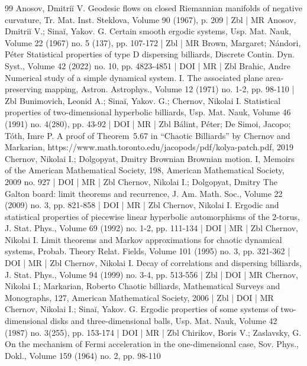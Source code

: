 \documentclass[10pt]{amsart}
\theoremstyle{definition}\newtheorem{defi}[theo]{Definition}\newtheorem{rema}[theo]{Remark}\newtheorem{exam}[theo]{Example}\newtheorem{exem}[theo]{Example}\newtheorem{nota}[theo]{Notation}
\begin{document}
\begin{thebibliography}{99}
Anosov, Dmitriĭ V. Geodesic flows on closed Riemannian manifolds of negative curvature, Tr. Mat. Inst. Steklova, Volume 90 (1967), p. 209 | Zbl | MR
Anosov, Dmitriĭ V.; Sinaĭ, Yakov. G. Certain smooth ergodic systems, Usp. Mat. Nauk, Volume 22 (1967) no. 5 (137), pp. 107-172 | Zbl | MR
Brown, Margaret; Nándori, Péter Statistical properties of type D dispersing billiards, Discrete Contin. Dyn. Syst., Volume 42 (2022) no. 10, pp. 4823-4851 | DOI | MR | Zbl
Brahic, Andre Numerical study of a simple dynamical system. I. The associated plane area-preserving mapping, Astron. Astrophys., Volume 12 (1971) no. 1-2, pp. 98-110 | Zbl
Bunimovich, Leonid A.; Sinaĭ, Yakov. G.; Chernov, Nikolai I. Statistical properties of two-dimensional hyperbolic billiards, Usp. Mat. Nauk, Volume 46 (1991) no. 4(280), pp. 43-92 | DOI | MR | Zbl
Bálint, Péter; De Simoi, Jacopo; Tóth, Imre P. A proof of Theorem 5.67 in “Chaotic Billiards” by Chernov and Markarian, https://www.math.toronto.edu/jacopods/pdf/kolya-patch.pdf, 2019
Chernov, Nikolai I.; Dolgopyat, Dmitry Brownian Brownian motion. I, Memoirs of the American Mathematical Society, 198, American Mathematical Society, 2009 no. 927 | DOI | MR | Zbl
Chernov, Nikolai I.; Dolgopyat, Dmitry The Galton board: limit theorems and recurrence, J. Am. Math. Soc., Volume 22 (2009) no. 3, pp. 821-858 | DOI | MR | Zbl
Chernov, Nikolai I. Ergodic and statistical properties of piecewise linear hyperbolic automorphisms of the 2-torus, J. Stat. Phys., Volume 69 (1992) no. 1-2, pp. 111-134 | DOI | MR | Zbl
Chernov, Nikolai I. Limit theorems and Markov approximations for chaotic dynamical systems, Probab. Theory Relat. Fields, Volume 101 (1995) no. 3, pp. 321-362 | DOI | MR | Zbl
Chernov, Nikolai I. Decay of correlations and dispersing billiards, J. Stat. Phys., Volume 94 (1999) no. 3-4, pp. 513-556 | Zbl | DOI | MR
Chernov, Nikolai I.; Markarian, Roberto Chaotic billiards, Mathematical Surveys and Monographs, 127, American Mathematical Society, 2006 | Zbl | DOI | MR
Chernov, Nikolai I.; Sinaĭ, Yakov. G. Ergodic properties of some systems of two-dimensional disks and three-dimensional balls, Usp. Mat. Nauk, Volume 42 (1987) no. 3(255), pp. 153-174 | DOI | MR | Zbl
Chirikov, Boris V.; Zaslavsky, G. On the mechanism of Fermi acceleration in the one-dimensional case, Sov. Phys., Dokl., Volume 159 (1964) no. 2, pp. 98-110

\end{thebibliography}
\end{document}
